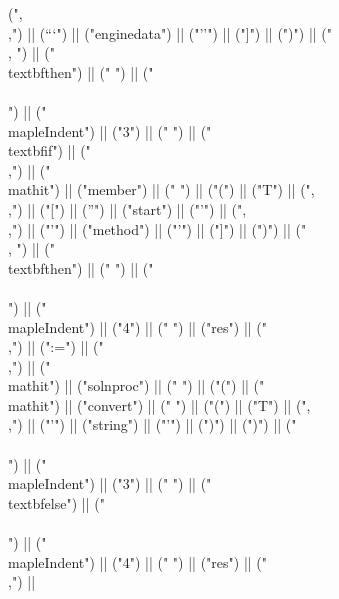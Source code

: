\documentclass{article}
\begin{document}
\begin{center}
\begin{maplelatex}
{(",\\,") || ("``") || ("enginedata") || ("''") || ("]") || (")") || (" \\, ") || ("\\textbf{then}") || (" ") || ("\\\\\n") || ("\\mapleIndent{") || ("3") || ("} ") || ("\\textbf{if}") || (" \\,") || ("\\mathit{") || ("member") || ("} ") || ("(") || ("T") || (",\\,") || ("[") || ("'") || ("start") || ("'") || (",\\,") || ("'") || ("method") || ("'") || ("]") || (")") || (" \\, ") || ("\\textbf{then}") || (" ") || ("\\\\\n") || ("\\mapleIndent{") || ("4") || ("} ") || ("res") || ("\\,") || (":=") || ("\\,") || ("\\mathit{") || ("solnproc") || ("} ") || ("(") || ("\\mathit{") || ("convert") || ("} ") || ("(") || ("T") || (",\\,") || ("'") || ("string") || ("'") || (")") || (")") || ("\\\\\n") || ("\\mapleIndent{") || ("3") || ("} ") || ("\\textbf{else}") || ("\\\\\n") || ("\\mapleIndent{") || ("4") || ("} ") || ("res") || ("\\,") ||}
\end{maplelatex}
\end{center}
\end{document}
